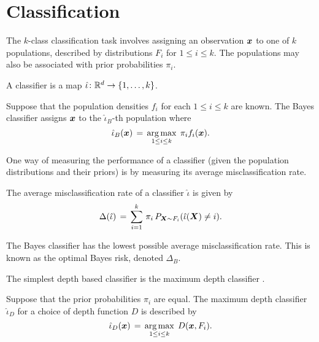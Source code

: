 \section{Classification}
\label{sec:multivariate_classification}

The $k$-class classification task involves assigning an observation $\bm{x}$ to
one of $k$ populations, described by distributions $F_i$ for $1 \leq i \leq
k$.
The populations may also be associated with prior probabilities $\pi_i$.

\begin{definition}[Classifier]
    A classifier is a map $\hat{\iota}\colon \mathbb{R}^d \to \{1, \dots, k\}$.
\end{definition}

\begin{example}
    Suppose that the population densities $f_i$ for each $1 \leq i \leq k$ are
    known.
    The Bayes classifier assigns $\bm{x}$ to the $\hat{\iota}_B$-th population
    where
    \begin{equation}
        \hat{\iota}_B(\bm{x}) \,=\, \operatorname*{arg\,max}_{1 \leq i \leq k}\; \pi_i f_i(\bm{x}).
    \end{equation}
\end{example}

One way of measuring the performance of a classifier (given the population
distributions and their priors) is by measuring its average misclassification
rate.

\begin{definition}
    The average misclassification rate of a classifier $\hat{\iota}$ is given
    by
    \begin{equation}
        \Delta(\hat{\iota}) \,=\, \sum_{i = 1}^k\, \pi_i\,P_{\bm{X} \sim F_i}(\hat{\iota}(\bm{X}) \neq i).
    \end{equation}
\end{definition}

\begin{proposition}
    The Bayes classifier has the lowest possible average misclassification
    rate. This is known as the optimal Bayes risk, denoted $\Delta_B$.
\end{proposition}

The simplest depth based classifier is the maximum depth classifier
\parencite{ghosh-chaudhuri-2005}.

\begin{example}
    Suppose that the prior probabilities $\pi_i$ are equal.
    The maximum depth classifier $\hat{\iota}_D$ for a choice of depth
    function $D$ is described by
    \begin{equation}
        \hat{\iota}_D(\bm{x}) \,=\, \operatorname*{arg\,max}_{1 \leq i \leq k}\; D(\bm{x}, F_i).
    \end{equation}
\end{example}

